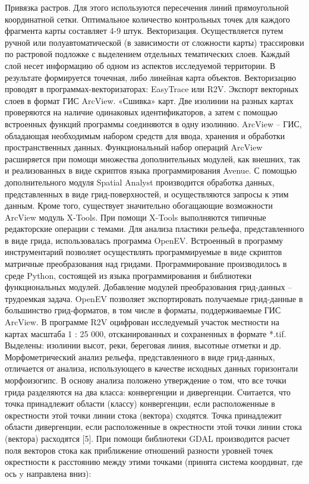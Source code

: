\documentclass[runningheads]{AIIT}
\begin{document}
Привязка растров. Для этого используются пересечения линий прямоугольной координатной сетки. Оптимальное количество контрольных точек для каждого фрагмента карты составляет 4-9 штук.
Векторизация. Осуществляется путем ручной или полуавтоматической (в зависимости от сложности карты) трассировки по растровой подложке с выделением отдельных тематических слоев. Каждый слой несет информацию об одном из аспектов исследуемой территории. В результате формируется точечная, либо линейная карта объектов. Векторизацию проводят в программах-векторизаторах: EasyTrace или R2V.
Экспорт векторных слоев в формат ГИС ArcView.
«Сшивка» карт. Две изолинии на разных картах проверяются на наличие одинаковых идентификаторов, а затем с помощью встроенных функций программы соединяются в одну изолинию.
ArcView – ГИС, обладающая необходимым набором средств для ввода, хранения и обработки пространственных данных. Функциональный набор операций ArcView расширяется при помощи множества дополнительных модулей, как внешних, так и реализованных в виде скриптов языка программирования Avenue. С помощью дополнительного модуля Spatial Analyst производится обработка данных, представленных в виде грид-поверхностей, и осуществляются запросы к этим данным. Кроме того, существует значительно обогащающие возможности ArcView модуль X-Tools. При помощи X-Tools выполняются типичные редакторские операции с темами.
Для анализа пластики рельефа, представленного в виде грида, использовалась программа OpenEV. Встроенный в программу инструментарий позволяет осуществлять программируемые в виде скриптов матричные преобразования над гридами. Программирование производилось в среде Python, состоящей из языка программирования и библиотеки функциональных модулей. Добавление модулей преобразования грид-данных – трудоемкая задача. OpenEV позволяет экспортировать получаемые грид-данные в большинство грид-форматов, в том числе в форматы, поддерживаемые ГИС ArcView.
В программе R2V оцифрован исследуемый участок местности на картах масштаба  1 : 25 000, отсканированных и сохраненных в формате *.tif. Выделены: изолинии высот, реки, береговая линия, высотные отметки и др.
Морфометрический анализ рельефа, представленного в виде грид-данных, отличается от анализа, использующего в качестве исходных данных горизонтали морфоизогипс. В основу анализа положено утверждение о том, что все точки грида разделяются на два класса: конвергенции и дивергенции. Считается, что точка принадлежит области (классу) конвергенции, если расположенные в окрестности этой точки линии стока (вектора) сходятся. Точка принадлежит области дивергенции, если расположенные в окрестности этой точки линии стока (вектора) расходятся [5].
При помощи библиотеки GDAL производится расчет поля векторов стока как приближение отношений разности уровней точек окрестности к расстоянию между этими точками (принята система координат, где ось y направлена вниз):
\end{document}
